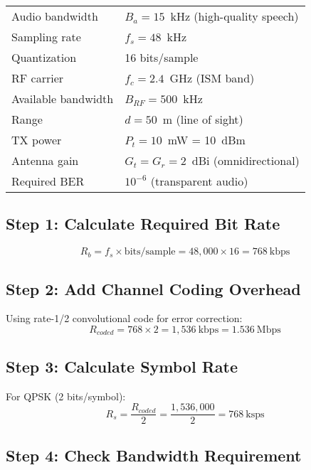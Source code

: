 \begin{tabular}{@{}ll@{}}
Audio bandwidth & $B_a = 15$~kHz (high-quality speech) \\
Sampling rate & $f_s = 48$~kHz \\
Quantization & 16 bits/sample \\
RF carrier & $f_c = 2.4$~GHz (ISM band) \\
Available bandwidth & $B_{RF} = 500$~kHz \\
Range & $d = 50$~m (line of sight) \\
TX power & $P_t = 10$~mW = 10~dBm \\
Antenna gain & $G_t = G_r = 2$~dBi (omnidirectional) \\
Required BER & $10^{-6}$ (transparent audio) \\
\end{tabular}

\subsection*{Step 1: Calculate Required Bit Rate}

\begin{equation}
R_b = f_s \times \text{bits/sample} = 48{,}000 \times 16 = 768~\text{kbps}
\end{equation}

\subsection*{Step 2: Add Channel Coding Overhead}

Using rate-1/2 convolutional code for error correction:
\begin{equation}
R_{coded} = 768 \times 2 = 1{,}536~\text{kbps} = 1.536~\text{Mbps}
\end{equation}

\subsection*{Step 3: Calculate Symbol Rate}

For QPSK (2 bits/symbol):
\begin{equation}
R_s = \frac{R_{coded}}{2} = \frac{1{,}536{,}000}{2} = 768~\text{ksps}
\end{equation}

\subsection*{Step 4: Check Bandwidth Requirement}

